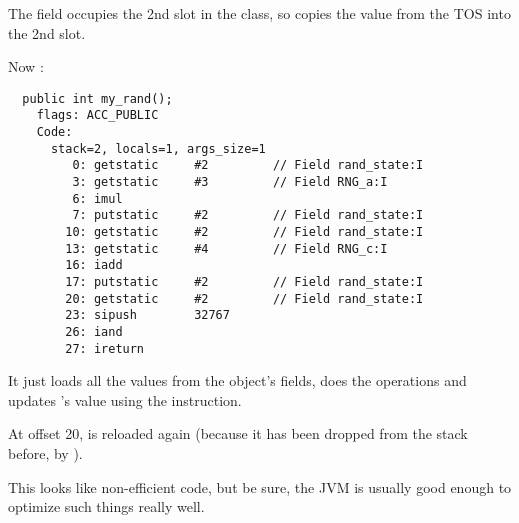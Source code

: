 The field  occupies the 2nd slot in the class,
so  copies the value from the \ac{TOS} into the 2nd slot.


Now :

\begin{lstlisting}
  public int my_rand();
    flags: ACC_PUBLIC
    Code:
      stack=2, locals=1, args_size=1
         0: getstatic     #2         // Field rand_state:I
         3: getstatic     #3         // Field RNG_a:I
         6: imul          
         7: putstatic     #2         // Field rand_state:I
        10: getstatic     #2         // Field rand_state:I
        13: getstatic     #4         // Field RNG_c:I
        16: iadd          
        17: putstatic     #2         // Field rand_state:I
        20: getstatic     #2         // Field rand_state:I
        23: sipush        32767
        26: iand          
        27: ireturn       
\end{lstlisting}

It just loads all the values from the object's fields, does the operations and updates 
's value using the  instruction.

At offset 20,  is reloaded again 
(because it has been dropped from the stack before, by ).

This looks like non-efficient code, but be sure, the \ac{JVM} is usually good enough to optimize
such things really well.

